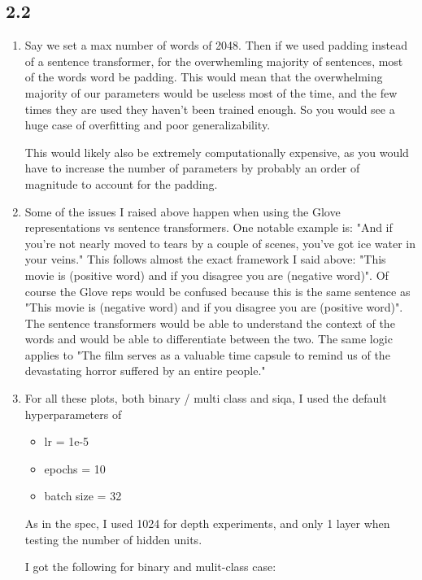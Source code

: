 \documentclass[12pt]{article}
\theoremstyle{definitionstyle}
\begin{document}
    \newpage
    \subsection*{2.2}
    \begin{enumerate}
        \item Say we set a max number of words of 2048. Then if we used padding instead of a sentence transformer, for the overwhemling majority of sentences, most of the words word be padding. This would mean that the overwhelming majority of our parameters would be useless most of the time, and the few times they are used they haven't been trained enough. So you would see a huge case of overfitting and poor generalizability. 

        This would likely also be extremely computationally expensive, as you would have to increase the number of parameters by probably an order of magnitude to account for the padding.

        \item Some of the issues I raised above happen when using the Glove representations vs sentence transformers. One notable example is: "And if you're not nearly moved to tears by a couple of scenes, you've got ice water in your veins." This follows almost the exact framework I said above: "This movie is (positive word) and if you disagree you are (negative word)". Of course the Glove reps would be confused because this is the same sentence as "This movie is (negative word) and if you disagree you are (positive word)". The sentence transformers would be able to understand the context of the words and would be able to differentiate between the two. The same logic applies to "The film serves as a valuable time capsule to remind us of the devastating horror suffered by an entire people." 

        \newpage
        \item

        For all these plots, both binary / multi class and siqa, I used the default hyperparameters of 
        \begin{itemize}
            \item lr = 1e-5
            \item epochs = 10
            \item batch size = 32
        \end{itemize}
        As in the spec, I used 1024 for depth experiments, and only 1 layer when testing the number of hidden units. 

        I got the following for binary and mulit-class case:


\end{enumerate}
\end{document}
